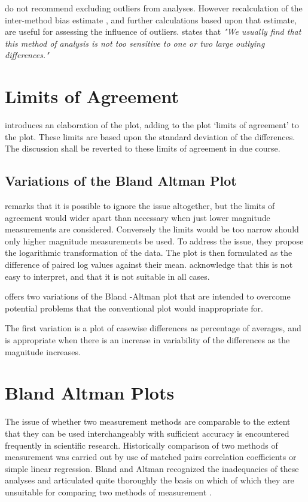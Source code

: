 \documentclass[12pt, a4paper]{report}
\begin{document}
\citet*{BA99} do not recommend excluding outliers from analyses. However recalculation of the inter-method bias estimate , and
further calculations based upon that estimate, are useful for assessing the influence of outliers.\citep{BA99} states that
\emph{"We usually find that this method of analysis is not too sensitive to one or two large outlying differences."}

\newpage
\section{Limits of Agreement}
\citet{BA86} introduces an elaboration of the plot, adding to the plot `limits of agreement' to the plot. These limits are based
upon the standard deviation of the differences. The discussion shall be reverted to these limits of agreement in due course.

\subsection{Variations of the Bland Altman Plot}
\citet{BA99} remarks that it is possible to ignore the issue altogether, but the limits of agreement would wider apart than
necessary when just lower magnitude measurements are considered. Conversely the limits would be too narrow should only higher
magnitude measurements be used. To address the issue, they propose the logarithmic transformation of the data. The plot is then
formulated as the difference of paired log values against their mean. \citet{BA99} acknowledge that this is not easy to interpret,
and that it is not suitable in all cases.

\citet{BA99} offers two variations of the Bland -Altman plot that are intended to overcome potential problems that the conventional
plot would inappropriate for.

The first variation is a plot of casewise differences as percentage of averages, and is appropriate when there is an
increase in variability of the differences as the magnitude increases.



\section{Bland Altman Plots}
The issue of whether two measurement methods are comparable to the extent that they can be used interchangeably with sufficient
accuracy is encountered frequently in scientific research. Historically comparison of two methods of measurement was carried
out by use of matched pairs correlation coefficients or simple linear regression. Bland and Altman recognized the inadequacies of
these analyses and articulated quite thoroughly the basis on which of which they are unsuitable for comparing two methods of
measurement \citep*{BA83}.
\end{document}
